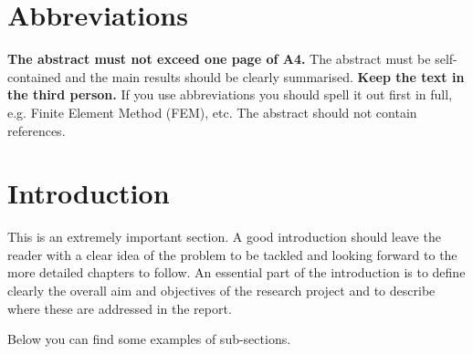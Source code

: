 \documentclass[a4paper,12pt]{article}
\begin{document}
\frontMatter


\section*{Abbreviations}
\label{sec:abbreviations}

\textbf{The abstract must not exceed one page of A4.} The abstract must be self-contained and the main results should be clearly summarised. \textbf{Keep the text in the third person.} If you use abbreviations you should spell it out first in full, e.g. Finite Element Method (FEM), etc. The abstract should not contain references.


\clearpage
\pagestyle{fancy}


\tableofcontents %


\clearpage

\section{Introduction}
\label{sec:introduction}

This is an extremely important section. A good introduction should leave the reader with a clear idea of the problem to be tackled and looking forward to the more detailed chapters to follow. An essential part of the introduction is to define clearly the overall aim and objectives of the research project and to describe where these are addressed in the report.

Below you can find some examples of sub-sections.



\clearpage


\end{document}
